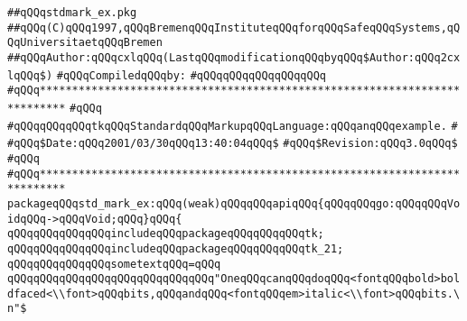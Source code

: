 \label{src/lib/tk/src/toolkit/tests+examples/stdmark_ex.pkg}
\verb|##qQQqstdmark_ex.pkg|\newline
\verb|##qQQq(C)qQQq1997,qQQqBremenqQQqInstituteqQQqforqQQqSafeqQQqSystems,qQQqUniversitaetqQQqBremen|\newline
\verb|##qQQqAuthor:qQQqcxlqQQq(LastqQQqmodificationqQQqbyqQQq$Author:qQQq2cxlqQQq$)|\newline
\newline
\verb|#qQQqCompiledqQQqby:|\newline
\verb|#qQQqqQQqqQQqqQQqqQQq|\newline
\newline
\newline
\newline
\verb|#qQQq**************************************************************************|\newline
\verb|#qQQq|\newline
\verb|#qQQqqQQqqQQqtkqQQqStandardqQQqMarkupqQQqLanguage:qQQqanqQQqexample.|\newline
\verb|#|\newline
\verb|#qQQq$Date:qQQq2001/03/30qQQq13:40:04qQQq$|\newline
\verb|#qQQq$Revision:qQQq3.0qQQq$|\newline
\verb|#qQQq|\newline
\verb|#qQQq**************************************************************************|\newline
\newline
\newline
\newline
\verb|packageqQQqstd_mark_ex:qQQq(weak)qQQqqQQqapiqQQq{qQQqqQQqgo:qQQqqQQqVoidqQQq->qQQqVoid;qQQq}qQQq{|\newline
\newline
\verb|qQQqqQQqqQQqqQQqincludeqQQqpackageqQQqqQQqqQQqtk;|\newline
\verb|qQQqqQQqqQQqqQQqincludeqQQqpackageqQQqqQQqqQQqtk_21;|\newline
\newline
\verb|qQQqqQQqqQQqqQQqsometextqQQq=qQQq|\newline
\verb|qQQqqQQqqQQqqQQqqQQqqQQqqQQqqQQq"OneqQQqcanqQQqdoqQQq<fontqQQqbold>boldfaced<\\font>qQQqbits,qQQqandqQQq<fontqQQqem>italic<\\font>qQQqbits.\n"$|\newline
